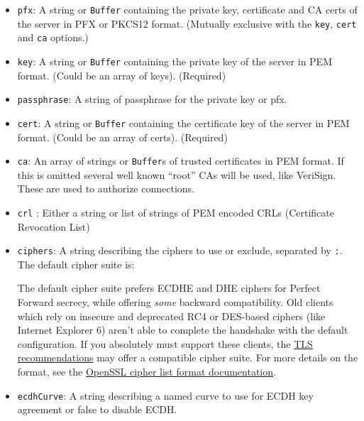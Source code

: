\begin{itemize}
\item
  \texttt{pfx}: A string or \texttt{Buffer} containing the private key,
  certificate and CA certs of the server in PFX or PKCS12 format.
  (Mutually exclusive with the \texttt{key}, \texttt{cert} and
  \texttt{ca} options.)
\item
  \texttt{key}: A string or \texttt{Buffer} containing the private key
  of the server in PEM format. (Could be an array of keys). (Required)
\item
  \texttt{passphrase}: A string of passphrase for the private key or
  pfx.
\item
  \texttt{cert}: A string or \texttt{Buffer} containing the certificate
  key of the server in PEM format. (Could be an array of certs).
  (Required)
\item
  \texttt{ca}: An array of strings or \texttt{Buffer}s of trusted
  certificates in PEM format. If this is omitted several well known
  ``root'' CAs will be used, like VeriSign. These are used to authorize
  connections.
\item
  \texttt{crl} : Either a string or list of strings of PEM encoded CRLs
  (Certificate Revocation List)
\item
  \texttt{ciphers}: A string describing the ciphers to use or exclude,
  separated by \texttt{:}. The default cipher suite is:

\begin{Shaded}
\begin{Highlighting}[]
\end{Highlighting}
\end{Shaded}

  The default cipher suite prefers ECDHE and DHE ciphers for Perfect
  Forward secrecy, while offering \emph{some} backward compatibility.
  Old clients which rely on insecure and deprecated RC4 or DES-based
  ciphers (like Internet Explorer 6) aren't able to complete the
  handshake with the default configuration. If you absolutely must
  support these clients, the
  \href{https://wiki.mozilla.org/Security/Server_Side_TLS}{TLS
  recommendations} may offer a compatible cipher suite. For more details
  on the format, see the
  \href{http://www.openssl.org/docs/apps/ciphers.html\#CIPHER_LIST_FORMAT}{OpenSSL
  cipher list format documentation}.
\item
  \texttt{ecdhCurve}: A string describing a named curve to use for ECDH
  key agreement or false to disable ECDH.


\end{itemize}
